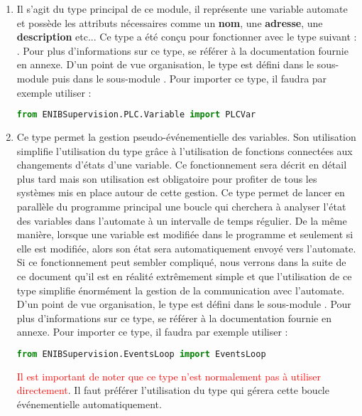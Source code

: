 \begin{enumerate}

\item \label{tag-presentation-PLCVar}  \newline
Il s'agit du type principal de ce module, il représente une variable automate et possède les attributs nécessaires comme un \textbf{nom}, une \textbf{adresse}, une \textbf{description} etc... Ce type a été conçu pour fonctionner avec le type suivant : .\newline
Pour plus d'informations sur ce type, se référer à la documentation fournie en annexe.\newline
D'un point de vue organisation, le type  est défini dans le sous-module  puis dans le sous-module . \newline
Pour importer ce type, il faudra par exemple utiliser :
\begin{lstlisting}[language=Python]
from ENIBSupervision.PLC.Variable import PLCVar
\end{lstlisting}

\item {} \newline
Ce type permet la gestion pseudo-événementielle des variables. Son utilisation simplifie l'utilisation du type  grâce à l'utilisation de fonctions connectées aux changements d'états d'une variable. Ce fonctionnement sera décrit en détail plus tard mais son utilisation est obligatoire pour profiter de tous les systèmes mis en place autour de cette gestion.\newline
Ce type permet de lancer en parallèle du programme principal une boucle qui cherchera à analyser l'état des variables dans l'automate à un intervalle de temps régulier. De la même manière, lorsque une variable est modifiée dans le programme et seulement si elle est modifiée, alors son état sera automatiquement envoyé vers l'automate. \newline
Si ce fonctionnement peut sembler compliqué, nous verrons dans la suite de ce document qu'il est en réalité extrêmement simple et que l'utilisation de ce type simplifie énormément la gestion de la communication avec l'automate. \newline
D'un point de vue organisation, le type  est défini dans le sous-module .\newline
Pour plus d'informations sur ce type, se référer à la documentation fournie en annexe.\newline
Pour importer ce type, il faudra par exemple utiliser :
\begin{lstlisting}[language=Python]
from ENIBSupervision.EventsLoop import EventsLoop
\end{lstlisting}
\textcolor{red}{Il est important de noter que ce type n'est normalement pas à utiliser directement}. Il faut préférer l'utilisation du type  qui gérera cette boucle événementielle automatiquement.


\end{enumerate}

